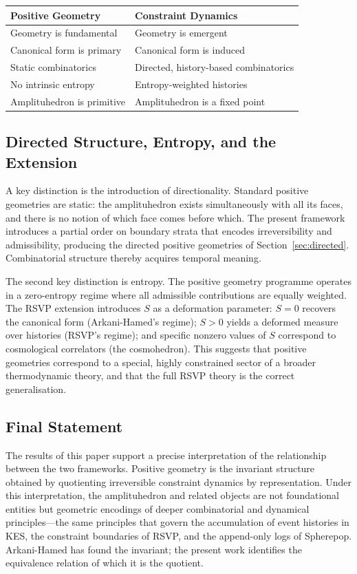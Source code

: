\documentclass[12pt, oneside]{amsart}
\theoremstyle{plain}
\theoremstyle{definition}
\theoremstyle{remark}
\newcommand{\Sf}{S}
\begin{document}
\begin{center}
\begin{tabular}{ll}
\toprule
Positive Geometry & Constraint Dynamics \\
\midrule
Geometry is fundamental & Geometry is emergent \\
Canonical form is primary & Canonical form is induced \\
Static combinatorics & Directed, history-based combinatorics \\
No intrinsic entropy & Entropy-weighted histories \\
Amplituhedron is primitive & Amplituhedron is a fixed point \\
\bottomrule
\end{tabular}
\end{center}

\subsection{Directed Structure, Entropy, and the Extension}

A key distinction is the introduction of directionality. Standard positive geometries are static: the amplituhedron exists simultaneously with all its faces, and there is no notion of which face comes before which. The present framework introduces a partial order on boundary strata that encodes irreversibility and admissibility, producing the directed positive geometries of Section~\ref{sec:directed}. Combinatorial structure thereby acquires temporal meaning.

The second key distinction is entropy. The positive geometry programme operates in a zero-entropy regime where all admissible contributions are equally weighted. The RSVP extension introduces $\Sf$ as a deformation parameter: $\Sf = 0$ recovers the canonical form (Arkani-Hamed's regime); $\Sf > 0$ yields a deformed measure over histories (RSVP's regime); and specific nonzero values of $\Sf$ correspond to cosmological correlators (the cosmohedron). This suggests that positive geometries correspond to a special, highly constrained sector of a broader thermodynamic theory, and that the full RSVP theory is the correct generalisation.

\subsection{Final Statement}

The results of this paper support a precise interpretation of the relationship between the two frameworks. Positive geometry is the invariant structure obtained by quotienting irreversible constraint dynamics by representation. Under this interpretation, the amplituhedron and related objects are not foundational entities but geometric encodings of deeper combinatorial and dynamical principles---the same principles that govern the accumulation of event histories in KES, the constraint boundaries of RSVP, and the append-only logs of Spherepop. Arkani-Hamed has found the invariant; the present work identifies the equivalence relation of which it is the quotient.
\end{document}
